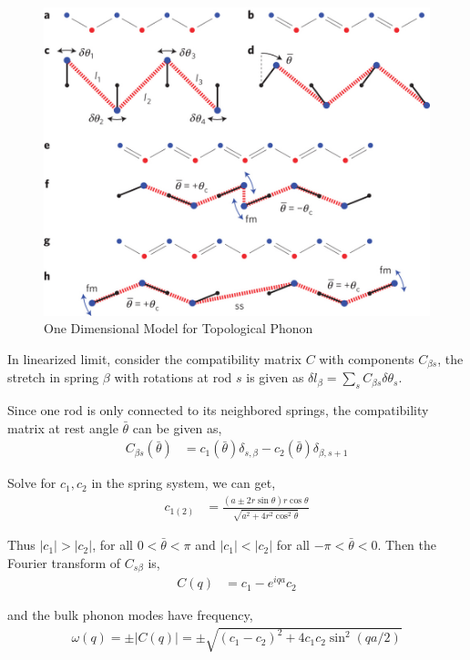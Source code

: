 \documentclass[aps,pre,preprint,groupedaddress]{revtex4-1}
\begin{document}
\begin{figure}[h]
\centering
\includegraphics[scale=0.4]{nphys2835-f1.jpg}
\caption{One Dimensional Model for Topological Phonon}
\label{fig1}
\end{figure}

In linearized limit, consider the compatibility matrix $C$ with components $C_{\beta s}$, the stretch in spring $\beta$ with rotations at rod $s$ is given as $\delta l_{\beta} = \sum_{s} C_{\beta s} \delta \theta_{s}$.

Since one rod is only connected to its neighbored springs, the compatibility matrix at rest angle $\bar{\theta}$ can be given as,
\begin{align}
C_{\beta s}(\bar{\theta}) &= c_1(\bar{\theta}) \delta_{s,\beta} - c_2(\bar{\theta})\delta_{\beta, s+1}
\end{align}

Solve for $c_1, c_2$ in the spring system, we can get,
\begin{align}
c_{1(2)} &= \displaystyle \frac{(a \pm 2r \sin{\theta})r\cos{\theta}}{\sqrt{a^2+4r^2\cos^2{\bar{\theta}}}}
\end{align}

Thus $|c_1| > |c_2|$, for all $0 < \bar{\theta} < \pi$ and $|c_1| < |c_2|$ for all $-\pi < \bar{\theta} < 0$. Then the Fourier transform of $C_{s\beta}$ is,
\begin{align}
C(q) &= c_1 - e^{iqa}c_2
\label{eq6.4}
\end{align}

and the bulk phonon modes have frequency,
\begin{align}
\omega(q) = \pm |C(q)| = \pm \sqrt{(c_1-c_2)^2+4c_1c_2\sin^2{(qa/2)}}
\end{align}
\end{document}
